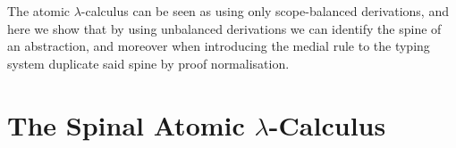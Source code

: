 \documentclass[a4paper,UKenglish,cleveref, autoref]{lipics-v2019}
\newcommand{\lamrule}{\lambda}
\begin{document}
The atomic $\lambda$-calculus can be seen as using only scope-balanced derivations, and here we show that by using unbalanced derivations we can identify the spine of an abstraction, and moreover when introducing the medial rule to the typing system duplicate said spine by proof normalisation.
%
%


\section{The Spinal Atomic $\lambda$-Calculus}
\end{document}

